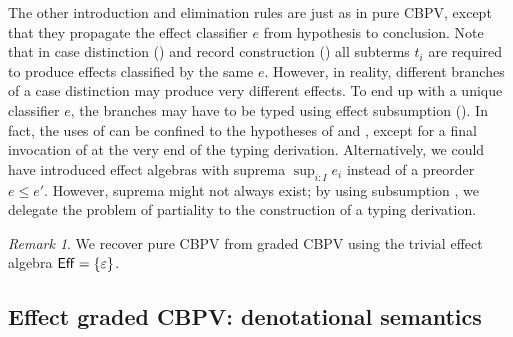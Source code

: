 \documentclass[acmsmall,review,anonymous]{acmart}\settopmatter{printfolios=true,printccs=false,printacmref=false}
\theoremstyle{remark}
\newtheorem{remark}{Remark}
\begin{document}
The other introduction and elimination rules are just as in pure
CBPV, except that they propagate the effect classifier $e$ from
hypothesis to conclusion.  Note that in case distinction (\relim\GS)
and record construction (\rintro\Pi) all subterms $t_i$ are required
to produce effects classified by the same $e$.  However, in reality,
different branches of \eg a case distinction may produce
very different effects.  To end up with a unique classifier $e$, the
branches may have to be typed using effect subsumption (\rsub).  In
fact, the uses of \rsub can be confined to the hypotheses of \relim\GS
and \rintro\Pi, except for a final invocation of \rsub at the very end
of the typing derivation.  Alternatively, we could have introduced
effect algebras with suprema $\sup_{i:I} e_i$ instead of a preorder $e
\leq e'$.  However, suprema might not always exist; by using
subsumption \rsub, we delegate the problem of partiality to the
construction of a typing derivation.

\begin{remark}\label{rem:cbpv}
  We recover pure CBPV from graded CBPV using the trivial effect
  algebra $\mathsf{Eff} = \{\varepsilon\}$.
\end{remark}

\subsection{Effect graded CBPV: denotational semantics}
\end{document}
